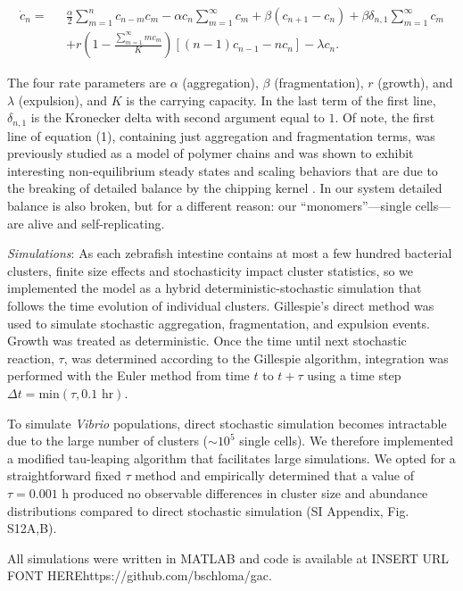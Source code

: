 \begin{align}
\dot{c}_n = \text{ }& \frac{\alpha}{2}\sum_{m=1}^{n} c_{n-m}c_m - \alpha c_n \sum_{m=1}^{\infty}c_m+\beta(c_{n+1}- c_n) + \beta\delta_{n,1}\sum_{m=1}^{\infty}c_m\nonumber\\[6pt]
&+r\left(1-\frac{\sum_{m=1}^{\infty}mc_m}{K}\right)\left[(n-1)c_{n-1} - nc_n\right]  - \lambda c_n. 
\end{align}

\noindent The four rate parameters are $\alpha$ (aggregation), $\beta$ (fragmentation), $r$ (growth), and $\lambda$ (expulsion), and $K$ is the carrying capacity. In the last term of the first line,  $\delta_{n,1}$ is the Kronecker delta with second argument equal to $1$. Of note, the first line of equation (1), containing just aggregation and fragmentation terms, was previously studied as a model of polymer chains and was shown to exhibit interesting non-equilibrium steady states and scaling behaviors that are due to the breaking of detailed balance by the chipping kernel \cite{krapivsky1996transitional}. In our system detailed balance is also broken, but for a different reason: our ``monomers''---single cells---are alive and self-replicating.

\textit{Simulations}: As each zebrafish intestine contains at most a few hundred bacterial clusters, finite size effects and stochasticity impact cluster statistics, so we implemented the model as a hybrid deterministic-stochastic simulation that follows the time evolution of individual clusters. Gillespie's direct method \cite{gillespie1977exact} was used to simulate stochastic aggregation, fragmentation, and expulsion events. Growth was treated as deterministic. Once the time until next stochastic reaction, $\tau$, was determined according to the Gillespie algorithm, integration was performed with the Euler method from time $t$ to $t+\tau$ using a time step $\Delta t = \text{min}(\tau, 0.1 \text{ hr})$. 

To simulate \textit{Vibrio} populations, direct stochastic simulation becomes intractable due to the large number of clusters ($\sim 10^5$ single cells). We therefore implemented a modified tau-leaping algorithm \cite{gillespie2001approximate} that facilitates large simulations. We opted for a straightforward fixed $\tau$ method and empirically determined that a value of $\tau = 0.001$ h produced no observable differences in cluster size and abundance distributions compared to direct stochastic simulation (SI Appendix, Fig. S12A,B).

All simulations were written in MATLAB and code is available at INSERT URL FONT HERE{https://github.com/bschloma/gac}.

